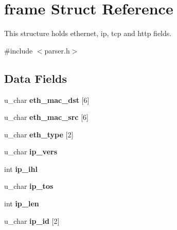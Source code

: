 \hypertarget{structframe}{}\section{frame Struct Reference}
\label{structframe}


This structure holds ethernet, ip, tcp and http fields.  




{\ttfamily \#include $<$parser.\+h$>$}

\subsection*{Data Fields}
\begin{DoxyCompactItemize}
\item 
\hypertarget{structframe_a2891038240ffc1f30d7760f3caf152f2}{}u\+\_\+char {\bfseries eth\+\_\+mac\+\_\+dst} \mbox{[}6\mbox{]}\label{structframe_a2891038240ffc1f30d7760f3caf152f2}

\item 
\hypertarget{structframe_a153f4ad7db316fb79f32c270a42c8f6e}{}u\+\_\+char {\bfseries eth\+\_\+mac\+\_\+src} \mbox{[}6\mbox{]}\label{structframe_a153f4ad7db316fb79f32c270a42c8f6e}

\item 
\hypertarget{structframe_a0a930cfc929ad3cf439f8900e7bae943}{}u\+\_\+char {\bfseries eth\+\_\+type} \mbox{[}2\mbox{]}\label{structframe_a0a930cfc929ad3cf439f8900e7bae943}

\item 
\hypertarget{structframe_a5418735b35cbad1c9b178e0d2b8280d7}{}u\+\_\+char {\bfseries ip\+\_\+vers}\label{structframe_a5418735b35cbad1c9b178e0d2b8280d7}

\item 
\hypertarget{structframe_ae5704f88df87e7e9bb89505317e5c638}{}int {\bfseries ip\+\_\+ihl}\label{structframe_ae5704f88df87e7e9bb89505317e5c638}

\item 
\hypertarget{structframe_a6097ab4474472b66fbbb546ab0322a84}{}u\+\_\+char {\bfseries ip\+\_\+tos}\label{structframe_a6097ab4474472b66fbbb546ab0322a84}

\item 
\hypertarget{structframe_aa97e9334141b9ad8bb9360e85e243c85}{}int {\bfseries ip\+\_\+len}\label{structframe_aa97e9334141b9ad8bb9360e85e243c85}

\item 
\hypertarget{structframe_a9c0f0b0a8d520a10119b64b637cfa4e3}{}u\+\_\+char {\bfseries ip\+\_\+id} \mbox{[}2\mbox{]}\label{structframe_a9c0f0b0a8d520a10119b64b637cfa4e3}


\end{DoxyCompactItemize}
